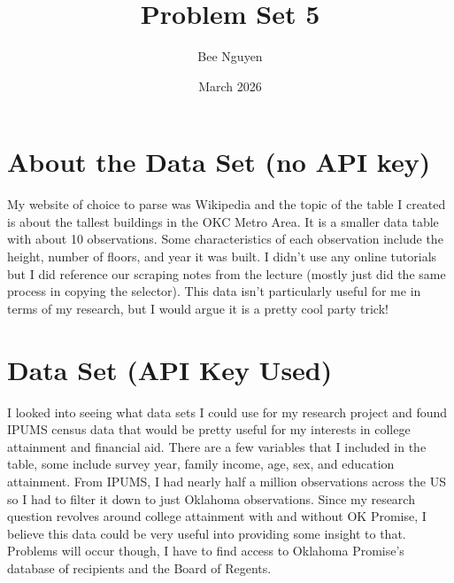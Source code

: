 \documentclass{article}
\title{Problem Set 5}
\author{Bee Nguyen}
\date{March 2026}
\begin{document}
\maketitle

\section{About the Data Set (no API key)}

My website of choice to parse was Wikipedia and the topic of the table I created is about the tallest buildings in the OKC Metro Area. It is a smaller data table with about 10 observations. Some characteristics of each observation include the height, number of floors, and year it was built. I didn't use any online tutorials but I did reference our scraping notes from the lecture (mostly just did the same process in copying the selector). This data isn't particularly useful for me in terms of my research, but I would argue it is a pretty cool party trick!

\section{Data Set (API Key Used)}
I looked into seeing what data sets I could use for my research project and found IPUMS census data that would be pretty useful for my interests in college attainment and financial aid. There are a few variables that I included in the table, some include survey year, family income, age, sex, and education attainment. From IPUMS, I had nearly half a million observations across the US so I had to filter it down to just Oklahoma observations. Since my research question revolves around college attainment with and without OK Promise, I believe this data could be very useful into providing some insight to that. Problems will occur though, I have to find access to Oklahoma Promise's database of recipients and the Board of Regents. 
\end{document}
